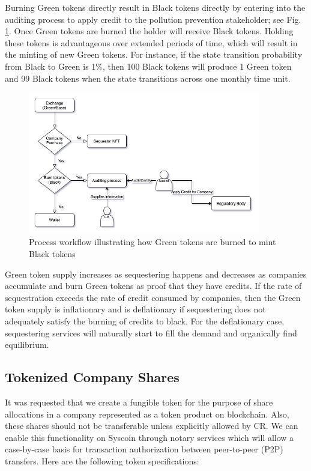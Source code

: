 \documentclass{article}
\begin{document}
Burning Green tokens directly result in Black tokens directly by entering into the auditing process to apply credit to the pollution prevention stakeholder; see Fig. \ref{fig:green_to_black}. Once Green tokens are burned the holder will receive Black tokens. Holding these tokens is advantageous over extended periods of time, which will result in the minting of new Green tokens. For instance, if the state transition probability from Black to Green is 1\%, then 100 Black tokens will produce 1 Green token and 99 Black tokens when the state transitions across one monthly time unit.

\begin{figure}[h]
\centering
\includegraphics[width=4in]{green_to_black.png}
\caption{Process workflow illustrating how Green tokens are burned to mint Black tokens} 
\label{fig:green_to_black}
\end{figure} 

Green token supply increases as sequestering happens and decreases as companies accumulate and burn Green tokens as proof that they have credits. If the rate of sequestration exceeds the rate of credit consumed by companies, then the Green token supply is inflationary and is deflationary if sequestering does not adequately satisfy the burning of credits to black. For the deflationary case, sequestering services will naturally start to fill the demand and organically find equilibrium.

\subsection{Tokenized Company Shares}

It was requested that we create a fungible token for the purpose of share allocations in a company represented as a token product on blockchain. Also, these shares should not be transferable unless explicitly allowed by CR. We can enable this functionality on Syscoin through notary services which will allow a case-by-case basis for transaction authorization between peer-to-peer (P2P) transfers. Here are the following token specifications:
\end{document}
